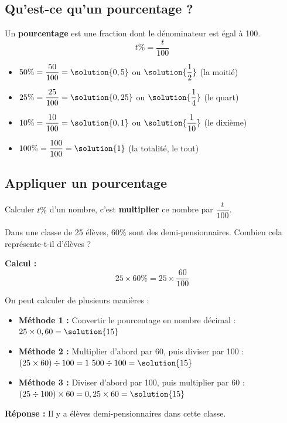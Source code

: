 \subsection{Qu'est-ce qu'un pourcentage ?}

\begin{definitionbox}[Pourcentage]
	Un \textbf{pourcentage} est une fraction dont le dénominateur est égal à 100.
	$$t\% = \dfrac{t}{100}$$
\end{definitionbox}

\begin{examplebox}
	\begin{itemize}
		\item $50\% = \dfrac{50}{100} = \solution{0,5}$ ou $\solution{\dfrac{1}{2}}$ (la moitié)
		\item $25\% = \dfrac{25}{100} = \solution{0,25}$ ou $\solution{\dfrac{1}{4}}$ (le quart)
		\item $10\% = \dfrac{10}{100} = \solution{0,1}$ ou $\solution{\dfrac{1}{10}}$ (le dixième)
		\item $100\% = \dfrac{100}{100} = \solution{1}$ (la totalité, le tout)
	\end{itemize}
\end{examplebox}

\subsection{Appliquer un pourcentage}

\begin{proprietebox}
	Calculer $t\%$ d'un nombre, c'est \textbf{multiplier} ce nombre par $\dfrac{t}{100}$.
\end{proprietebox}

\begin{examplebox}
	Dans une classe de 25 élèves, $60\%$ sont des demi-pensionnaires. Combien cela représente-t-il d'élèves ?

	\textbf{Calcul :}
	$$25 \times 60\% = 25 \times \dfrac{60}{100}$$

	On peut calculer de plusieurs manières :
	\begin{itemize}
		\item \textbf{Méthode 1 :} Convertir le pourcentage en nombre décimal : $25 \times 0,60 = \solution{15}$
		\item \textbf{Méthode 2 :} Multiplier d'abord par 60, puis diviser par 100 : $(25 \times 60) \div 100 = 1~500 \div 100 = \solution{15}$
		\item \textbf{Méthode 3 :} Diviser d'abord par 100, puis multiplier par 60 : $(25 \div 100) \times 60 = 0,25 \times 60 = \solution{15}$
	\end{itemize}

	\textbf{Réponse :} Il y a  élèves demi-pensionnaires dans cette classe.
\end{examplebox}

